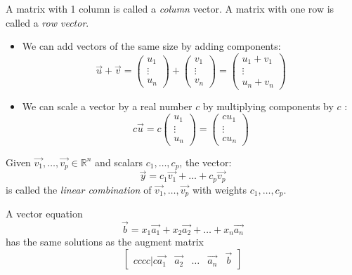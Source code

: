 \documentclass[11pt]{scrartcl}
\theoremstyle{dotlessP}
\theoremstyle{dotlessN}
\newcommand{\reals}{\mathbb{R}} %
\begin{document}
\begin{definition}
	A matrix with 1 column is called a \textit{column} vector. A matrix with one row is called a \textit{row vector}.
\end{definition}
\begin{itemize}
	\item We can add vectors of the same size by adding components:
	\[
		\vec{u} + \vec{v} =
		\begin{pmatrix}
			u_1 \\
			\vdots \\
			u_n
		\end{pmatrix} + 
		\begin{pmatrix}
			v_1 \\
			\vdots \\
			v_n
		\end{pmatrix} =
		\begin{pmatrix}
			u_1 + v_1 \\
			\vdots \\
			u_n + v_n 
		\end{pmatrix}
	\] 
\item We can scale a vector by a real number $c$ by multiplying components by $c$ :
	\[
		c\vec{u} = c 
		\begin{pmatrix}
			u_1 \\
			\vdots \\
			u_n 
		\end{pmatrix} = 
		\begin{pmatrix}
			cu_1 \\
			\vdots \\
			cu_n 
		\end{pmatrix}
	\] 
\end{itemize}
\begin{definition}
	Given $\vec{v_1}, \dots, \vec{v_p} \in \reals^n$ and scalars $c_1, \dots, c_p$, the vector:
	\[
		\vec{y} = c_1 \vec{v_1} + \dots + c_p \vec{v_p}
	\] 
	is called the \textit{linear combination} of $\vec{v_1}, \dots, \vec{v_p}$ with weights $c_1, \dots, c_p$.
\end{definition}
\begin{remark}
	A vector equation 
	\[
		\vec{b} = x_1 \vec{a_1} + x_2 \vec{a_2} + \dots + x_n \vec{a_n}
	\] 
	has the same solutions as the augment matrix
	\[
		\begin{bmatrix}{cccc|c}
			\vec{a_1} & \vec{a_2} & \dots & \vec{a_n} & \vec{b}
	\end{bmatrix}
	\] 
\end{remark}
\end{document}
